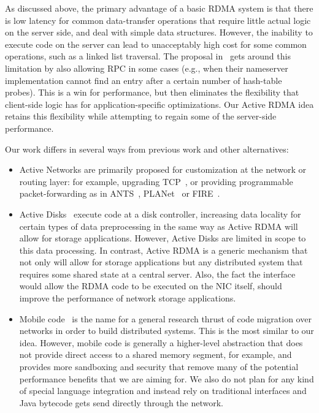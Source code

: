 \documentclass[10pt]{article}
\begin{document}
As discussed above, the primary advantage of a basic RDMA system is
that there is low latency for common data-transfer operations that
require little actual logic on the server side, and deal with simple
data structures. However, the inability to execute code on the server
can lead to unacceptably high cost for some common operations, such as
a linked list traversal. The proposal in~\cite{thekkath94} gets around
this limitation by also allowing RPC in some cases (e.g., when their
nameserver implementation cannot find an entry after a certain number
of hash-table probes). This is a win for performance, but then
eliminates the flexibility that client-side logic has for
application-specific optimizations. Our Active RDMA idea retains this
flexibility while attempting to regain some of the server-side
performance.

Our work differs in several ways from previous work and other
alternatives:

\begin{itemize} \itemsep -2pt

\item Active Networks are primarily proposed for customization at the
  network or routing layer: for example, upgrading TCP~\cite{AN-tcp},
  or providing programmable packet-forwarding as in ANTS~\cite{ANTS},
  PLANet~\cite{planet} or FIRE~\cite{FIRE}.

\item Active Disks~\cite{AD2,AD} execute code at a disk controller,
  increasing data locality for certain types of data preprocessing in
  the same way as Active RDMA will allow for storage applications.
  However, Active Disks are limited in scope to this data processing.
  In contrast, Active RDMA is a generic mechanism that not only will
  allow for storage applications but any distributed system that
  requires some shared state at a central server. Also, the fact the
  interface would allow the RDMA code to be executed on the NIC itself, 
  should improve the performance of network storage applications.

\item Mobile code~\cite{mobile} is the name for a general research
  thrust of code migration over networks in order to build distributed
  systems. This is the most similar to our idea. However, mobile
  code is generally a higher-level abstraction that does not provide
  direct access to a shared memory segment, for example, and provides
  more sandboxing and security that remove many of the potential
  performance benefits that we are aiming for. We also do not plan for any kind of special language integration and instead rely on traditional interfaces and Java bytecode gets send directly through the network.

\end{itemize}
\end{document}
